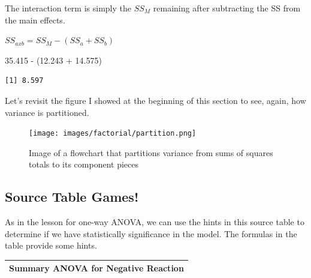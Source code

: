 \documentclass[
  11pt,
]{book}
\newenvironment{Shaded}{\begin{snugshade}}{\end{snugshade}}
\newcommand{\FloatTok}[1]{\textcolor[rgb]{0.00,0.00,0.81}{#1}}
\newcommand{\NormalTok}[1]{#1}
\newcommand{\SpecialCharTok}[1]{\textcolor[rgb]{0.00,0.00,0.00}{#1}}
\begin{document}
The interaction term is simply the \(SS_M\) remaining after subtracting the SS from the main effects.

\(SS_{axb} = SS_M - (SS_a + SS_b)\)

\begin{Shaded}
\begin{Highlighting}[]
\FloatTok{35.415} \SpecialCharTok{{-}}\NormalTok{ (}\FloatTok{12.243} \SpecialCharTok{+} \FloatTok{14.575}\NormalTok{)}
\end{Highlighting}
\end{Shaded}

\begin{verbatim}
[1] 8.597
\end{verbatim}

Let's revisit the figure I showed at the beginning of this section to see, again, how variance is partitioned.

\begin{figure}
\centering
\texttt{[image: images/factorial/partition.png]}
\caption{Image of a flowchart that partitions variance from sums of squares totals to its component pieces}
\end{figure}

\hypertarget{source-table-games-1}{%
\subsection{Source Table Games!}\label{source-table-games-1}}

As in the lesson for one-way ANOVA, we can use the hints in this source table to determine if we have statistically significance in the model. The formulas in the table provide some hints.

\begin{longtable}[]{@{}l@{}}
\toprule()
Summary ANOVA for Negative Reaction \\
\midrule()
\endhead
\bottomrule()
\end{longtable}
\end{document}
